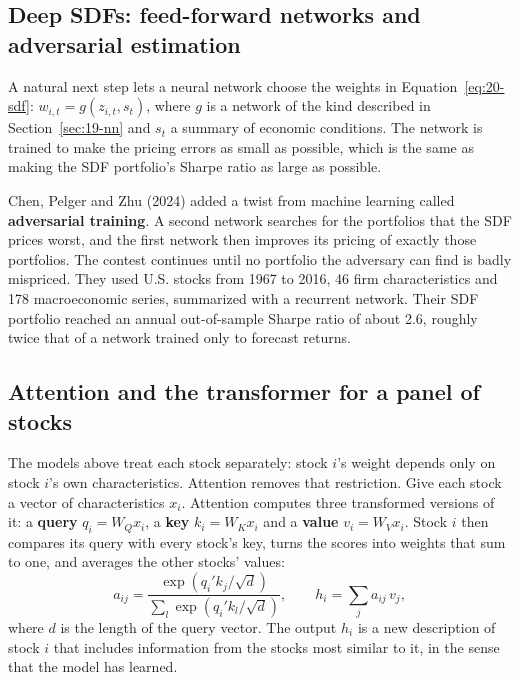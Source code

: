 \subsection{Deep SDFs: feed-forward networks and adversarial estimation}

A natural next step lets a neural network choose the weights in Equation~\eqref{eq:20-sdf}: $w_{i,t} = g(z_{i,t}, s_t)$, where $g$ is a network of the kind described in Section~\ref{sec:19-nn} and $s_t$ a summary of economic conditions. The network is trained to make the pricing errors as small as possible, which is the same as making the SDF portfolio's Sharpe ratio as large as possible.

Chen, Pelger and Zhu (2024) added a twist from machine learning called \textbf{adversarial training}. A second network searches for the portfolios that the SDF prices worst, and the first network then improves its pricing of exactly those portfolios. The contest continues until no portfolio the adversary can find is badly mispriced. They used U.S. stocks from 1967 to 2016, 46 firm characteristics and 178 macroeconomic series, summarized with a recurrent network. Their SDF portfolio reached an annual out-of-sample Sharpe ratio of about 2.6, roughly twice that of a network trained only to forecast returns.

\subsection{Attention and the transformer for a panel of stocks}

The models above treat each stock separately: stock $i$'s weight depends only on stock $i$'s own characteristics. Attention removes that restriction. Give each stock a vector of characteristics $x_i$. Attention computes three transformed versions of it: a \textbf{query} $q_i = W_Q x_i$, a \textbf{key} $k_i = W_K x_i$ and a \textbf{value} $v_i = W_V x_i$. Stock $i$ then compares its query with every stock's key, turns the scores into weights that sum to one, and averages the other stocks' values:
\begin{equation}
  a_{ij} = \frac{\exp\left(q_i' k_j/\sqrt{d}\right)}{\sum_{l} \exp\left(q_i' k_l/\sqrt{d}\right)}, \qquad h_i = \sum_{j} a_{ij}\, v_j,
  \label{eq:20-attention}
\end{equation}
where $d$ is the length of the query vector. The output $h_i$ is a new description of stock $i$ that includes information from the stocks most similar to it, in the sense that the model has learned.

